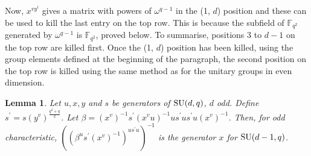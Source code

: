 \documentclass[12pt]{report}
\newtheorem{lemma}[definition]{Lemma}
\def\SU{{\rm SU}}
\begin{document}
Now, $x^{v{y^i}}$ gives a matrix with powers of $\omega^{q-1}$ in the (1, $d$) position and these can be used to kill the last entry on the top row. This is because the subfield of $\mathbb{F}_{q^2}$ generated by $\omega^{q-1}$ is $\mathbb{F}_{q^2}$, proved below. To summarise, positions 3 to $d-1$ on the top row are killed first. Once the (1, $d$) position has been killed, using the group elements defined at the beginning of the paragraph, the second position on the top row is killed using the same method as for the unitary groups in even dimension.

\begin{lemma}
Let $u, x, y$ and $s$ be generators of $\SU(d, q)$, $d$ odd. Define $s^\prime = s(y^v)^{\frac{q^2 + q}{2}}$. Let $\beta = (x^v)^{-1} s^\prime (x^v u)^{-1} u s^\prime u s^\prime u (x^v)^{-1}$. Then, for odd characteristic, $((\beta^u s^\prime (x^v)^{-1})^{u s^\prime u})^{-1}$ is the generator $x$ for $\SU(d-1, q)$.
\end{lemma}
\end{document}
